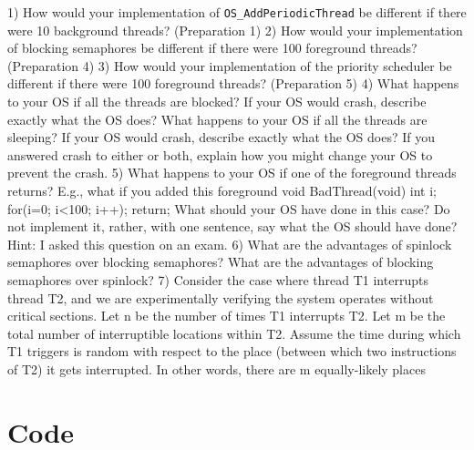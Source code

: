 \documentclass[12pt]{article}
\begin{document}
1) How would your implementation of \verb|OS_AddPeriodicThread| be different if there were 10 background
threads? (Preparation 1)
2) How would your implementation of blocking semaphores be different if there were 100 foreground threads?
(Preparation 4)
3) How would your implementation of the priority scheduler be different if there were 100 foreground threads?
(Preparation 5)
4) What happens to your OS if all the threads are blocked? If your OS would crash, describe exactly what the
OS does? What happens to your OS if all the threads are sleeping? If your OS would crash, describe exactly
what the OS does? If you answered crash to either or both, explain how you might change your OS to prevent
the crash.
5) What happens to your OS if one of the foreground threads returns? E.g., what if you added this foreground
void BadThread(void){ int i;
for(i=0; i<100; i++){};
return;
}
What should your OS have done in this case? Do not implement it, rather, with one sentence, say what the OS
should have done? Hint: I asked this question on an exam.
6) What are the advantages of spinlock semaphores over blocking semaphores? What are the advantages of
blocking semaphores over spinlock?
7) Consider the case where thread T1 interrupts thread T2, and we are experimentally verifying the system
operates without critical sections. Let n be the number of times T1 interrupts T2. Let m be the total number of
interruptible locations within T2. Assume the time during which T1 triggers is random with respect to the place
(between which two instructions of T2) it gets interrupted. In other words, there are m equally-likely places

\section{Code}



\end{document}
